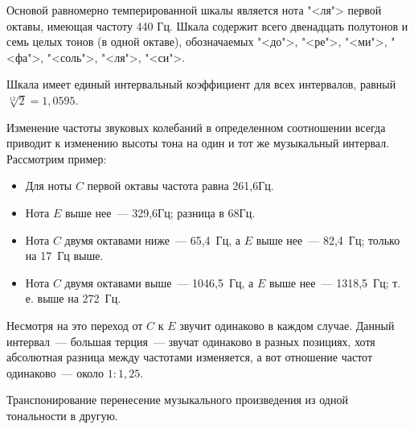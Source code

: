 \documentclass{beamer}
\begin{document}
\begin{frame}
Основой равномерно темперированной шкалы является нота "<ля"> первой октавы, имеющая частоту 440 Гц. Шкала содержит всего двенадцать полутонов и семь целых тонов (в одной октаве), обозначаемых "<до">, "<ре">, "<ми">, "<фа">, "<соль">, "<ля">, "<си">.


Шкала имеет единый интервальный коэффициент для всех интервалов, равный $\sqrt[12]{2} = 1,0595$. 
\end{frame}

\begin{frame}
Изменение частоты звуковых колебаний в определенном соотношении всегда приводит к изменению высоты тона на один и тот же музыкальный интервал. Рассмотрим пример: 
\begin{itemize}
\item Для ноты $C$ первой октавы частота равна 261,6Гц. 
\item Нота $E$ выше нее~--- 329,6Гц; разница в 68Гц.
\item Нота $C$ двумя октавами ниже~--- 65,4~Гц, а $E$ выше нее~--- 82,4~Гц; только на 17~Гц выше. 
\item Нота $C$ двумя октавами выше~--- 1046,5~Гц, а $E$ выше нее~--- 1318,5~Гц; т. е. выше на 272~Гц.
\end{itemize}

Несмотря на это переход от $C$ к $E$ звучит одинаково в каждом случае. Данный интервал~--- большая терция~--- звучат одинаково в разных позициях, хотя абсолютная разница между частотами изменяется, а вот отношение частот одинаково~--- около $1:1,25$.

\begin{block}{Транспонирование}
перенесение музыкального произведения из одной тональности в другую.
\end{block} 
\end{frame}
\end{document}
